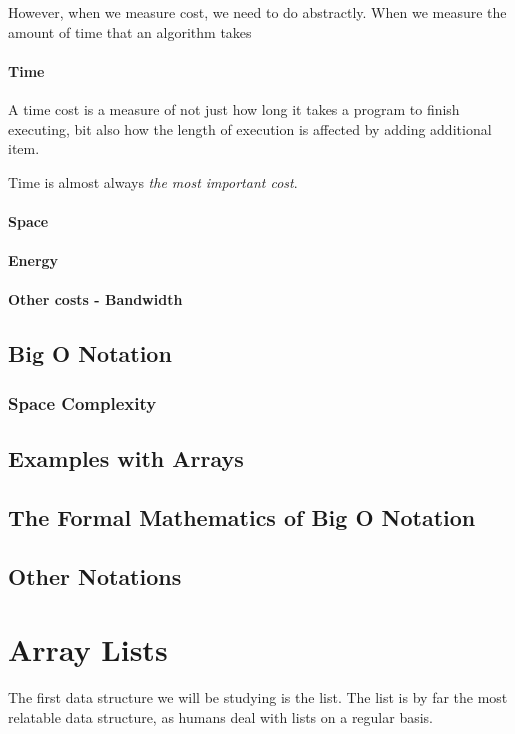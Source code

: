 \documentclass[10pt,a4paper]{book}
\begin{document}
However, when we measure cost, we need to do abstractly.  
When we measure the amount of time that an algorithm takes

\subsubsection{Time}
A time cost is a measure of not just how long it takes a program to finish executing, bit also how the length of execution is affected by adding additional item.

Time is almost always \emph{the most important cost}.

\subsubsection{Space}
\subsubsection{Energy}
\subsubsection{Other costs - Bandwidth}

\section{Big O Notation}

\subsection{Space Complexity}

\section{Examples with Arrays}





\section{The Formal Mathematics of Big O Notation}
\section{Other Notations}

\chapter{Array Lists}
\label{arraylist}
The first data structure we will be studying is the list.
The list is by far the most relatable data structure, as humans deal with lists on a regular basis.
\end{document}
